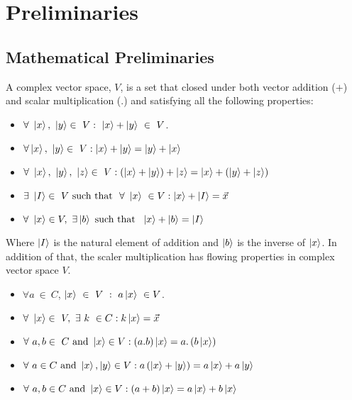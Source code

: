 \chapter{Preliminaries}
\section{ Mathematical Preliminaries }
\begin{defn}


A complex vector space, $V$, is a set that  closed under both vector addition
($ +$) and scalar multiplication (.) and satisfying all the following properties:
\begin{itemize}
\item $\forall~ \ket{x},~\ket{y} \in ~ V : ~\ket{x}+\ket{y} ~\in~ V $.
\item $\forall \ket{x},~\ket{y} \in ~ V : \ket{x}+\ket{y}=\ket{y}+\ket{x}$
\item $\forall~ \ket{x},~\ket{y}, ~\ket{z} \in ~ V:\left(\ket{x}+\ket{y}\right)+\ket{z}=\ket{x}+\left(\ket{y}+\ket{z}\right)$
\item $\exists ~\ket{I} \in ~V~ \text{such that }~ \forall~ \ket{x} ~\in V: \ket{x}+\ket{I}=\vec{x}$
\item $\forall ~\ket{x} \in V,~ \exists \ket{b} ~ \text{such that } ~\ket{x}+\ket{b}= \ket{I}$
\end{itemize}
Where $\ket{I}$ is the natural element of addition and $\ket{b}$ is the inverse of $\ket{x}$.
In addition of that, the scaler multiplication has flowing properties in complex vector space $V$.
\begin{itemize}
\item $\forall a~\in ~C$, $\ket{x}~\in ~V~ :~ a\ket{x}~ \in V$.
\item $\forall ~\ket{x} \in ~V,~ \exists~ k ~\in C :k\ket{x}=\vec{x}$
\item $\forall ~ a,b \in ~C ~\text{and} ~ \ket{x}\in V :\left(a.b\right) \ket{x}=a.\left(b \ket{x}\right)$
\item $\forall ~ a \in C ~\text{and} ~ \ket{x}, \ket{y}\in V:a\left(\ket{x}+\ket{y}\right)=a\ket{x}+a\ket{y}$
\item $\forall ~ a,b \in C ~\text{and} ~ \ket{x}\in V:\left(a+b\right)\ket{x}=a\ket{x}+b\ket{x}$
\end{itemize}
\end{defn}

